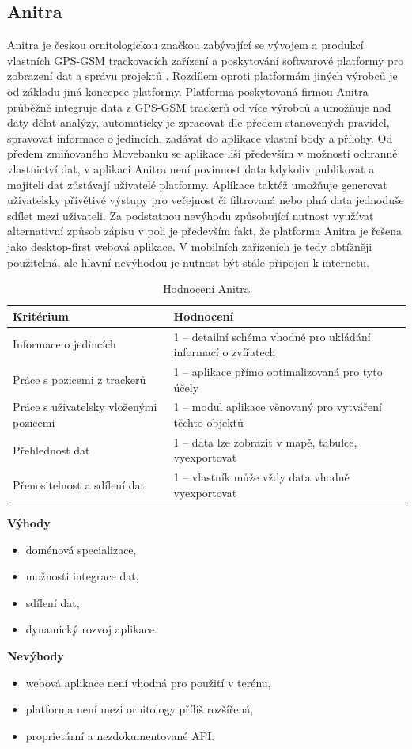 \subsection{Anitra}

Anitra je českou ornitologickou značkou zabývající se vývojem a produkcí vlastních GPS-GSM trackovacích zařízení a poskytování softwarové platformy pro zobrazení dat a správu projektů \cite{krouzkovaniPtakuAnitra}. Rozdílem oproti platformám jiných výrobců je od základu jiná koncepce platformy. Platforma poskytovaná firmou Anitra průběžně integruje data z GPS-GSM trackerů od více výrobců a umožňuje nad daty dělat analýzy, automaticky je zpracovat dle předem stanovených pravidel, spravovat informace o jedincích, zadávat do aplikace vlastní body a přílohy. Od předem zmiňovaného Movebanku se aplikace liší především v možnosti ochranně vlastnictví dat, v aplikaci Anitra není povinnost data kdykoliv publikovat a majiteli dat zůstávají uživatelé platformy. Aplikace taktéž umožňuje generovat uživatelsky přívětivé výstupy pro veřejnost či filtrovaná nebo plná data jednoduše sdílet mezi uživateli. Za podstatnou nevýhodu způsobující nutnost využívat alternativní způsob zápisu v poli je především fakt, že platforma Anitra je řešena jako desktop-first webová aplikace. V mobilních zařízeních je tedy obtížněji použitelná, ale hlavní nevýhodou je nutnost být stále připojen k internetu.

\begin{table}[H]
	\begin{tabularx}{\textwidth}{ | X | X | }
		\hline			
		Kritérium                              & Hodnocení \\
		\hline			
		Informace o jedincích                  & 1 -- detailní schéma vhodné pro ukládání informací o zvířatech          \\
		\hline
		Práce s pozicemi z trackerů            & 1 -- aplikace přímo optimalizovaná pro tyto účely          \\
		\hline
		Práce s uživatelsky vloženými pozicemi & 1 -- modul aplikace věnovaný pro vytváření těchto objektů          \\
		\hline
		Přehlednost dat                        & 1 -- data lze zobrazit v mapě, tabulce, vyexportovat          \\
		\hline
		Přenositelnost a sdílení dat           & 1 -- vlastník může vždy data vhodně vyexportovat          \\
		\hline	
	\end{tabularx}
	\caption{Hodnocení Anitra}
\end{table}
\textbf{Výhody}
\nolisttopbreak
\begin{itemize}
	\item doménová specializace,
	\item možnosti integrace dat,
	\item sdílení dat,
	\item dynamický rozvoj aplikace.
\end{itemize}

\textbf{Nevýhody}
\nolisttopbreak
\begin{itemize}
	\item webová aplikace není vhodná pro použití v terénu,
	\item platforma není mezi ornitology příliš rozšířená,
	\item proprietární a nezdokumentované API.
\end{itemize}

